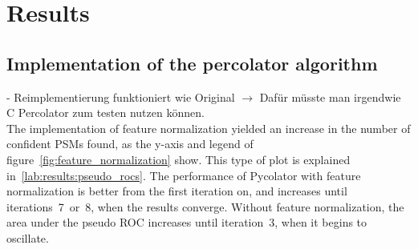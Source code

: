 \chapter{Results}
\label{results}


\section{Implementation of the percolator algorithm}
- Reimplementierung funktioniert wie Original $\rightarrow$ Dafür müsste man irgendwie C Percolator zum testen nutzen können. \\
The implementation of feature normalization yielded an increase in the number of confident PSMs found, as the y-axis and legend of figure~\ref{fig:feature_normalization} show. This type of plot is explained in~\autoref{lab:results:pseudo_rocs}. The performance of Pycolator with feature normalization is better from the first iteration on, and increases until iterations~7~or~8, when the results converge. Without feature normalization, the area under the pseudo ROC increases until iteration~3, when it begins to oscillate. \\
\renewcommand{\baselinestretch}{0.9}
